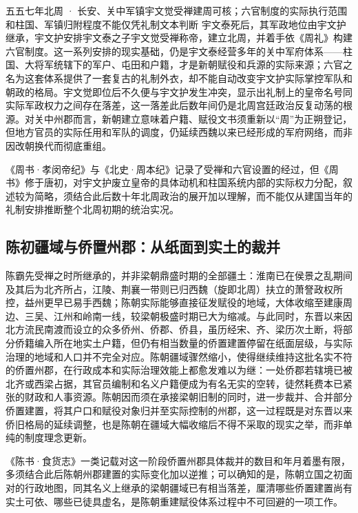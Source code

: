 \begin{event}{}{五五七年}{北周 · 长安、关中军镇}{宇文觉受禅建周可核；六官制度的实际执行范围和柱国、军镇归附程度不能仅凭礼制文本判断}
宇文泰死后，其军政地位由宇文护继承，宇文护安排宇文泰之子宇文觉受禅称帝，建立北周，并着手依《周礼》构建六官制度。这一系列安排的现实基础，仍是宇文泰经营多年的关中军府体系——柱国、大将军统辖下的军户、屯田和户籍，才是新朝赋役和兵源的实际来源；六官之名为这套体系提供了一套复古的礼制外衣，却不能自动改变宇文护实际掌控军队和朝政的格局。宇文觉即位后不久便与宇文护发生冲突，显示出礼制上的皇帝名号同实际军政权力之间存在落差，这一落差此后数年间仍是北周宫廷政治反复动荡的根源。对关中州郡而言，新朝建立意味着户籍、赋役文书须重新以“周”为正朔登记，但地方官员的实际任用和军队的调度，仍延续西魏以来已经形成的军府网络，而非因改朝换代而彻底重组。

《周书·孝闵帝纪》与《北史·周本纪》记录了受禅和六官设置的经过，但《周书》修于唐初，对宇文护废立皇帝的具体动机和柱国系统内部的实际权力分配，叙述较为简略，须结合此后数十年北周政治的展开加以理解，而不能仅从建国当年的礼制安排推断整个北周初期的统治实况。
\end{event}

\subsection{陈初疆域与侨置州郡：从纸面到实土的裁并}

陈霸先受禅之时所继承的，并非梁朝鼎盛时期的全部疆土：淮南已在侯景之乱期间及其后为北齐所占，江陵、荆襄一带则已归西魏（旋即北周）扶立的萧詧政权所控，益州更早已易手西魏；陈朝实际能够直接征发赋役的地域，大体收缩至建康周边、三吴、江州和岭南一线，较梁朝极盛时期已大为缩减。与此同时，东晋以来因北方流民南渡而设立的众多侨州、侨郡、侨县，虽历经宋、齐、梁历次土断，将部分侨籍编入所在地实土户籍，但仍有相当数量的侨置建置停留在纸面层级，与实际治理的地域和人口并不完全对应。陈朝疆域骤然缩小，使得继续维持这批名实不符的侨置州郡，在行政成本和实际治理效能上都愈发难以为继：一处侨郡若辖境已被北齐或西梁占据，其官员编制和名义户籍便成为有名无实的空转，徒然耗费本已紧张的财政和人事资源。陈朝因而须在承接梁朝旧制的同时，进一步裁并、合并部分侨置建置，将其户口和赋役对象归并至实际控制的州郡，这一过程既是对东晋以来侨旧格局的延续调整，也是陈朝在疆域大幅收缩后不得不采取的现实之举，而非单纯的制度理念更新。

《陈书·食货志》一类记载对这一阶段侨置州郡具体裁并的数目和年月着墨有限，多须结合此后陈朝州郡建置的实际变化加以逆推；可以确知的是，陈朝立国之初面对的行政地图，同其名义上继承的梁朝疆域已有相当落差，厘清哪些侨置建置尚有实土可依、哪些已徒具虚名，是陈朝重建赋役体系过程中不可回避的一项工作。

